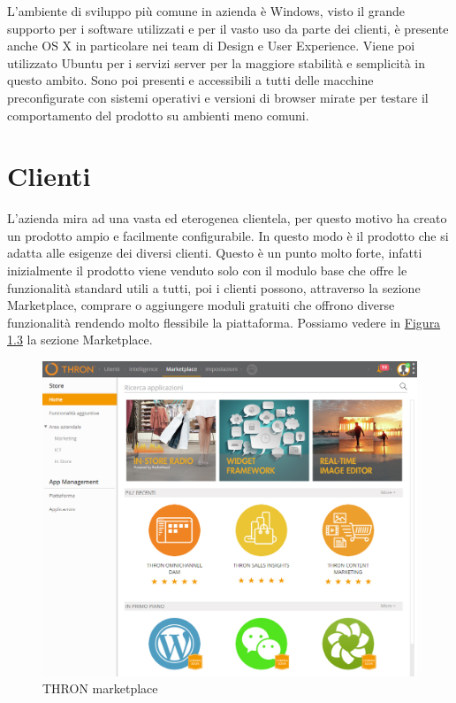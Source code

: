 \documentclass[a4paper, 12pt, twoside, openright]{book}
\begin{document}
L'ambiente di sviluppo più comune in azienda è Windows, visto il grande supporto per i software utilizzati e per il vasto uso da parte dei clienti, è presente anche OS X in particolare nei team di Design e User Experience. Viene poi utilizzato Ubuntu per i servizi server per la maggiore stabilità e semplicità in questo ambito. Sono poi presenti e accessibili a tutti delle macchine preconfigurate con sistemi operativi e versioni di browser mirate per testare il comportamento del prodotto su ambienti meno comuni.

\newpage{}
\section{Clienti}
L'azienda mira ad una vasta ed eterogenea clientela, per questo motivo ha creato un prodotto ampio e facilmente configurabile. In questo modo è il prodotto che si adatta alle esigenze dei diversi clienti. Questo è un punto molto forte, infatti inizialmente il prodotto viene venduto solo con il modulo base che offre le funzionalità standard utili a tutti, poi i clienti possono, attraverso la sezione Marketplace, comprare o aggiungere moduli gratuiti che offrono diverse funzionalità rendendo molto flessibile la piattaforma. Possiamo vedere in \hyperref[thron-marketplace]{Figura 1.3} la sezione Marketplace.
\begin{figure}[H]
	\centering
	\label{thron-marketplace}
	\includegraphics[width=1.0\textwidth]{images/thron-marketplace.jpg}
	\caption{THRON marketplace}
\end{figure}
\end{document}
